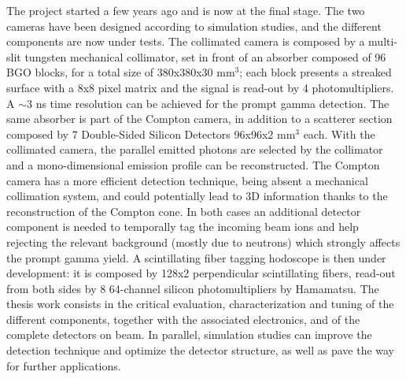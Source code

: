 The project started a few years ago and is now at the final stage. The two cameras have been designed according to simulation studies, and the different components are now under tests.
The collimated camera is composed by a multi-slit tungsten mechanical collimator, set in front of an absorber composed of 96 BGO blocks, for a total size of 380x380x30 mm$^{3}$; each block presents a streaked surface with a 8x8 pixel matrix and the signal is read-out by 4 photomultipliers. A $\sim$3 ns time resolution can be achieved for the prompt gamma detection. The same absorber is part of the Compton camera, in addition to a scatterer section composed by 7 Double-Sided Silicon Detectors 96x96x2 mm$^{3}$ each.
With the collimated camera, the parallel emitted photons are selected by the collimator and a mono-dimensional emission profile can be reconstructed. The Compton camera has a more efficient detection technique, being absent a mechanical collimation system, and could potentially lead to 3D information thanks to the reconstruction of the Compton cone. 
In both cases an additional detector component is needed to temporally tag the incoming beam ions and help rejecting the relevant background (mostly due to neutrons) which strongly affects the prompt gamma yield. A scintillating fiber tagging hodoscope is then under development: it is composed by 128x2 perpendicular scintillating fibers, read-out from both sides by 8 64-channel silicon photomultipliers by Hamamatsu. 
The thesis work consists in the critical evaluation, characterization and tuning of the different components, together with the associated electronics, and of the complete detectors on beam. In parallel, simulation studies can improve the detection technique and optimize the detector structure, as well as pave the way for further applications.    